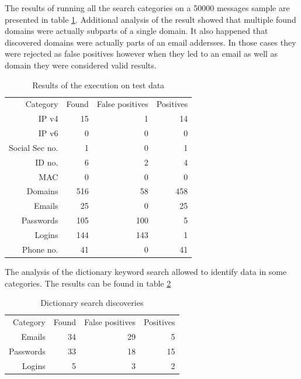 \documentclass[a4paper,twoside,12pt]{book}
\begin{document}
The results of running all the search categories on a 50000 messages sample are presented in table \ref{id:tab:wyniki}.
Additional analysis of the result showed that multiple found domains were actually subparts of a single
domain. It also happened that discovered domains were actually parts of an email addersses. In those cases
they were rejected as false positives however when they led to an email as well as domain they 
were considered valid results. 

\begin{table}
   \centering
   \caption{Results of the execution on test data}
   \label{id:tab:wyniki}
   \begin{tabular}{rrrr}
   \toprule
      Category       &   Found &   False positives & Positives \\
      IP v4          &      15 &                 1 &        14 \\
      IP v6          &       0 &                 0 &         0 \\
      Social Sec no. &       1 &                 0 &         1 \\
      ID no.         &       6 &                 2 &         4 \\
      MAC            &       0 &                 0 &         0 \\
      Domains        &     516 &                58 &       458 \\
      Emails         &      25 &                 0 &        25 \\
      Passwords      &     105 &               100 &         5 \\
      Logins         &     144 &               143 &         1 \\
      Phone no.      &      41 &                 0 &        41 \\
   \bottomrule
   \end{tabular}
   \end{table}  

The analysis of the dictionary keyword search allowed to identify data in some categories. The results can be found in table \ref{id:tab:wynikiDictionary}

\begin{table}
   \centering
   \caption{Dictionary search discoveries}
   \label{id:tab:wynikiDictionary}
   \begin{tabular}{rrrr}
   \toprule
      Category       &   Found &    False positives & Positives \\
      Emails         &      34 &                 29 &         5 \\
      Passwords      &      33 &                 18 &        15 \\
      Logins         &       5 &                  3 &         2 \\
   \bottomrule
   \end{tabular}
   \end{table} 
\end{document}
